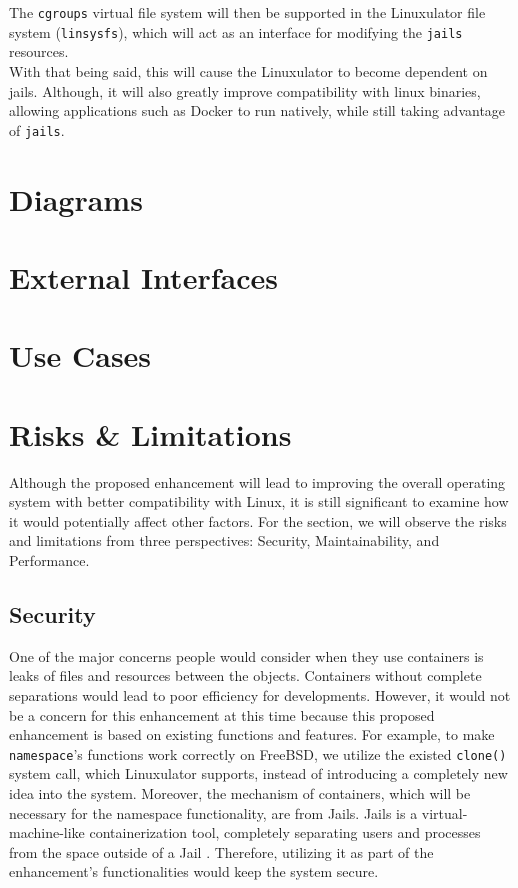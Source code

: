 \documentclass[12pt, dvipsnames, a4paper]{article}
\begin{document}
The \texttt{cgroups} virtual file system will then be supported in the
Linuxulator file system (\texttt{linsysfs}), which will act as an interface
for modifying the \texttt{jails} resources.\\

With that being said, this will cause the Linuxulator to become dependent on
jails. Although, it will also greatly improve compatibility with linux
binaries, allowing applications such as Docker to run natively, while still
taking advantage of \texttt{jails}.

\section{Diagrams}
\lipsum[1]

\section{External Interfaces}
\lipsum[1]

\section{Use Cases}
\lipsum[1]

\section{Risks \& Limitations}
Although the proposed enhancement will lead to improving the overall operating system with better compatibility with Linux, it is still significant to examine how it would potentially affect other factors. For the section, we will observe the risks and limitations from three perspectives: Security, Maintainability, and Performance.
\subsection{Security}
One of the major concerns people would consider when they use containers is leaks of files and resources between the objects. Containers without complete separations would lead to poor efficiency for developments. However, it would not be a concern for this enhancement at this time because this proposed enhancement is based on existing functions and features. For example, to make \texttt{namespace}’s functions work correctly on FreeBSD, we utilize the existed \texttt{clone()} system call, which Linuxulator supports, instead of introducing a completely new idea into the system. Moreover, the mechanism of containers, which will be necessary for the namespace functionality, are from Jails. Jails is a virtual-machine-like containerization tool, completely separating users and processes from the space outside of a Jail \cite{jail}. Therefore, utilizing it as part of the enhancement’s functionalities would keep the system secure.
\end{document}

